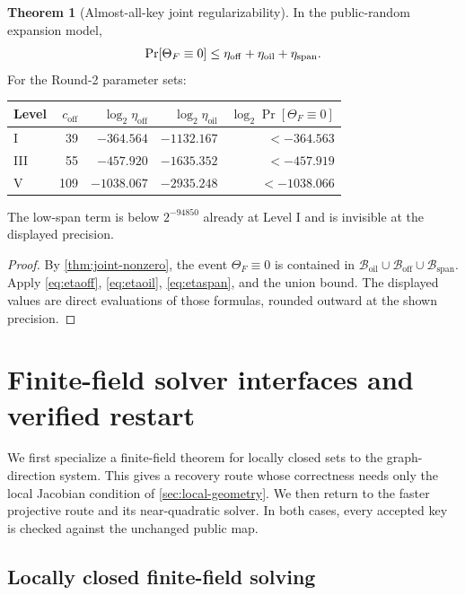 \documentclass[11pt,a4paper]{article}
\theoremstyle{definition}
\newtheorem{theorem}{Theorem}[section]
\theoremstyle{remark}
\newcommand{\cB}{\mathcal B}
\newcommand{\oil}{\mathrm{oil}}
\newcommand{\off}{\mathrm{off}}
\newcommand{\spanbad}{\mathrm{span}}
\begin{document}
\begin{theorem}[Almost-all-key joint regularizability]\label{thm:key-density}
In the public-random expansion model,
\begin{equation}\label{eq:keybad-total}
\Pr[\Theta_F\equiv0]
\le\eta_{\off}+\eta_{\oil}+\eta_{\rm span}.
\end{equation}
For the Round-2 parameter sets:
\begin{center}
\begin{tabular}{@{}lrrrr@{}}
\toprule
Level & $c_{\off}$ & $\log_2\eta_{\off}$ & $\log_2\eta_{\oil}$ & $\log_2\Pr[\Theta_F\equiv0]$\\
\midrule
I   & 39  & $-364.564$  & $-1132.167$ & $<-364.563$\\
III & 55  & $-457.920$  & $-1635.352$ & $<-457.919$\\
V   & 109 & $-1038.067$ & $-2935.248$ & $<-1038.066$\\
\bottomrule
\end{tabular}
\end{center}
The low-span term is below $2^{-94850}$ already at Level I and is invisible at the displayed precision.
\end{theorem}

\begin{proof}
By \cref{thm:joint-nonzero}, the event $\Theta_F\equiv0$ is contained in $\cB_{\oil}\cup\cB_{\off}\cup\cB_{\spanbad}$.  Apply \eqref{eq:etaoff}, \eqref{eq:etaoil}, \eqref{eq:etaspan}, and the union bound.  The displayed values are direct evaluations of those formulas, rounded outward at the shown precision.
\end{proof}

\section{Finite-field solver interfaces and verified restart}\label{sec:solver-attack}

We first specialize a finite-field theorem for locally closed sets to the graph-direction system.  This gives a recovery route whose correctness needs only the local Jacobian condition of \cref{sec:local-geometry}.  We then return to the faster projective route and its near-quadratic solver.  In both cases, every accepted key is checked against the unchanged public map.

\subsection{Locally closed finite-field solving}\label{subsec:local-solver}
\end{document}
